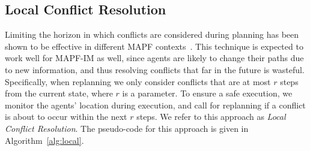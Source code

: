 \documentclass[letterpaper]{article} %
\def\
UrlFont{\rm}  %
\theoremstyle{definition}
\begin{document}
\subsection{Local Conflict Resolution}
\label{scn:local}
Limiting the horizon in which conflicts are considered during planning has been shown to be effective in different MAPF contexts~\cite{silver2005cooperative,li2021lifelong}. This technique is expected to work well for MAPF-IM as well, since agents are likely to change their paths due to new information, and thus resolving conflicts that far in the future is wasteful. Specifically, when replanning we only consider conflicts that are at most $r$ steps from the current state, where $r$ is a parameter. To ensure a safe execution, we monitor the agents' location during execution, and call for replanning if a conflict is about to occur within the next $r$ steps.
We refer to this approach as \emph{Local Conflict Resolution}. The pseudo-code for this approach is given in Algorithm~\ref{alg:local}. %


\end{document}

